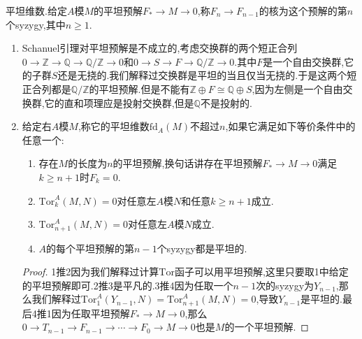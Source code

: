 平坦维数.给定$A$模$M$的平坦预解$F_*\to M\to0$,称$F_n\to F_{n-1}$的核为这个预解的第$n$个syzygy,其中$n\ge1$.
\begin{enumerate}
	\item Schanuel引理对平坦预解是不成立的,考虑交换群的两个短正合列$0\to\mathbb{Z}\to\mathbb{Q}\to\mathbb{Q}/\mathbb{Z}\to0$和$0\to S\to F\to\mathbb{Q}/\mathbb{Z}\to0$.其中$F$是一个自由交换群,它的子群$S$还是无挠的.我们解释过交换群是平坦的当且仅当无挠的.于是这两个短正合列都是$\mathbb{Q}/\mathbb{Z}$的平坦预解.但是不能有$\mathbb{Z}\oplus F\cong\mathbb{Q}\oplus S$,因为左侧是一个自由交换群,它的直和项理应是投射交换群,但是$\mathbb{Q}$不是投射的.
	\item 给定右$A$模$M$,称它的平坦维数$\mathrm{fd}_A(M)$不超过$n$,如果它满足如下等价条件中的任意一个:
	\begin{enumerate}
		\item 存在$M$的长度为$n$的平坦预解,换句话讲存在平坦预解$F_*\to M\to0$满足$k\ge n+1$时$F_k=0$.
		\item $\mathrm{Tor}_k^A(M,N)=0$对任意左$A$模$N$和任意$k\ge n+1$成立.
		\item $\mathrm{Tor}_{n+1}^A(M,N)=0$对任意左$A$模$N$成立.
		\item $A$的每个平坦预解的第$n-1$个syzygy都是平坦的.
	\end{enumerate}
    \begin{proof}
    	
    	1推2因为我们解释过计算$\mathrm{Tor}$函子可以用平坦预解,这里只要取1中给定的平坦预解即可.2推3是平凡的.3推4因为任取一个$n-1$次的syzygy为$Y_{n-1}$,那么我们解释过$\mathrm{Tor}_1^A(Y_{n-1},N)=\mathrm{Tor}_{n+1}^A(M,N)=0$,导致$Y_{n-1}$是平坦的.最后4推1因为任取平坦预解$F_*\to M\to0$,那么$0\to T_{n-1}\to F_{n-1}\to\cdots\to F_0\to M\to0$也是$M$的一个平坦预解.
    \end{proof}
\end{enumerate}

